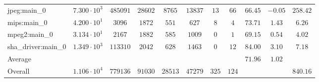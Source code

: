 \begin{tabular}{|l|c|c|c|c|c|c|c|c|c|c|}
jpeg:main\_0            & $ 7.300 \cdot 10^{3} $ & $ 485091 $ & $ 28602 $ & $ 8765  $ & $ 13837 $ & $ 13  $ & $ 66  $ & $ 66.45       $ & $ -0.05   $ & $ 258.42  $ \\
mips:main\_0            & $ 4.200 \cdot 10^{1} $ & $ 3096   $ & $ 1872  $ & $ 551   $ & $ 627   $ & $ 8   $ & $ 4   $ & $ 73.71       $ & $ 1.43    $ & $ 6.26    $ \\
mpeg2:main\_0           & $ 3.134 \cdot 10^{1} $ & $ 2167   $ & $ 1882  $ & $ 585   $ & $ 1009  $ & $ 0   $ & $ 1   $ & $ 69.15       $ & $ 0.54    $ & $ 4.02    $ \\
sha\_driver:main\_0     & $ 1.349 \cdot 10^{3} $ & $ 113310 $ & $ 2042  $ & $ 628   $ & $ 1463  $ & $ 0   $ & $ 12  $ & $ 84.00       $ & $ 3.10    $ & $ 7.18    $ \\
\hline
Average                 & $                    $ & $        $ & $       $ & $       $ & $       $ & $     $ & $     $ & $ 71.96       $ & $ 1.02    $ & $         $ \\
\hline
Overall                 & $ 1.106 \cdot 10^{4} $ & $ 779136 $ & $ 91030 $ & $ 28513 $ & $ 47279 $ & $ 325 $ & $ 124 $ & $             $ & $         $ & $ 840.16  $ \\
\hline
\end{tabular}
